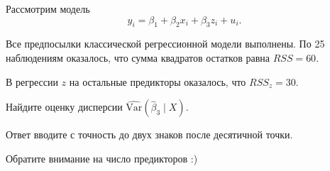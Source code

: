 
\begin{question}
Рассмотрим модель
\[
y_i = \beta_1 + \beta_2 x_i + \beta_3 z_i + u_i.
\]

Все предпосылки классической регрессионной модели выполнены.
По 25 наблюдениям оказалось, что сумма квадратов остатков равна \(RSS = 60\).

В регрессии \(z\) на остальные предикторы оказалось, что \(RSS_z = 30\).

Найдите оценку дисперсии \(\widehat{\mathrm{Var}}(\hat \beta_3 \mid X)\).

Ответ вводите с точность до двух знаков после десятичной точки.
\end{question}

\begin{solution}
Обратите внимание на число предикторов :)
\end{solution}

